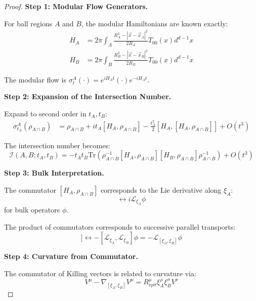 \documentclass[12pt,a4paper]{article}
\begin{document}
\begin{proof}
\textbf{Step 1: Modular Flow Generators.}

For ball regions $A$ and $B$, the modular Hamiltonians are known exactly:
\begin{align}
H_A &= 2\pi \int_A \frac{R_A^2 - |\vec{x} - \vec{x}_A|^2}{2R_A} T_{00}(x) d^{d-1}x \\
H_B &= 2\pi \int_B \frac{R_B^2 - |\vec{x} - \vec{x}_B|^2}{2R_B} T_{00}(x) d^{d-1}x
\end{align}

The modular flow is $\sigma_t^A(\cdot) = e^{iH_A t}(\cdot)e^{-iH_A t}$.

\textbf{Step 2: Expansion of the Intersection Number.}

Expand to second order in $t_A, t_B$:
\begin{align}
\sigma_{t_A}^A(\rho_{A \cap B}) &= \rho_{A \cap B} + it_A[H_A, \rho_{A \cap B}] - \frac{t_A^2}{2}[H_A, [H_A, \rho_{A \cap B}]] + O(t^3)
\end{align}

The intersection number becomes:
\begin{equation}
\mathcal{I}(A, B; t_A, t_B) = -t_A t_B \text{Tr}\left(\rho_{A \cap B}^{-1}[H_A, \rho_{A \cap B}][H_B, \rho_{A \cap B}]\rho_{A \cap B}^{-1}\right) + O(t^3)
\end{equation}

\textbf{Step 3: Bulk Interpretation.}

The commutator $[H_A, \rho_{A \cap B}]$ corresponds to the Lie derivative along $\xi_A$:
\begin{equation}
[H_A, \phi] \leftrightarrow i\mathcal{L}_{\xi_A}\phi
\end{equation}
for bulk operators $\phi$.

The product of commutators corresponds to successive parallel transports:
\begin{equation}
[H_A, [H_B, \phi]] \leftrightarrow -[\mathcal{L}_{\xi_A}, \mathcal{L}_{\xi_B}]\phi = -\mathcal{L}_{[\xi_A, \xi_B]}\phi
\end{equation}

\textbf{Step 4: Curvature from Commutator.}

The commutator of Killing vectors is related to curvature via:
\begin{equation}
[\nabla_{\xi_A}, \nabla_{\xi_B}]V^\mu - \nabla_{[\xi_A, \xi_B]}V^\mu = R^\mu_{\nu\rho\sigma}\xi_A^\rho \xi_B^\sigma V^\nu
\end{equation}


\end{proof}
\end{document}
